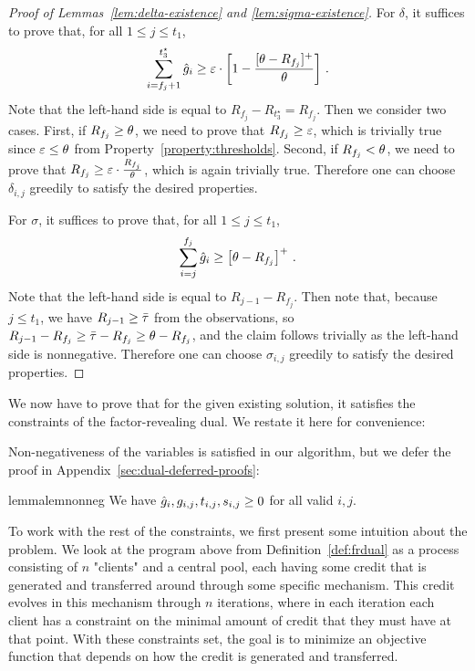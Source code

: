 \begin{proof}[Proof of Lemmas~\ref{lem:delta-existence} and \ref{lem:sigma-existence}]
For $\delta$, it suffices to prove that, for all $1 \leq j \leq t_1$,
\[\sum_{i=f_j+1}^{t_3^\star} \hat{g}_i \geq \varepsilon \cdot \left[1 -\frac{[\theta-R_{f_j}]^+}{\theta}\right]\,.\]
Note that the left-hand side is equal to $R_{f_j} - R_{t_3^\star} = R_{f_j}$.
Then we consider two cases.
First, if $R_{f_j} \geq \theta$, we need to prove that $R_{f_j} \geq \varepsilon$, which is trivially true since $\varepsilon\leq \theta$ from Property~\ref{property:thresholds}.
Second, if $R_{f_j} < \theta$, we need to prove that $R_{f_j} \geq \varepsilon \cdot \frac{R_{f_j}}{\theta}$, which is again trivially true.
Therefore one can choose $\delta_{i,j}$ greedily to satisfy the desired properties.

For $\sigma$, it suffices to prove that, for all $1 \leq j \leq t_1$,
\[\sum_{i=j}^{f_j} \hat{g}_i \geq \left[\theta - R_{f_j}\right]^+\,.\]
Note that the left-hand side is equal to $R_{j - 1} - R_{f_j}$.
Then note that, because $j \leq t_1$, we have $R_{j - 1} \geq \bar\tau$ from the observations, so $R_{j-1} - R_{f_j} \geq \bar\tau - R_{f_j}\geq \theta - R_{f_j}$, and the claim follows trivially as the left-hand side is nonnegative.
Therefore one can choose $\sigma_{i,j}$ greedily to satisfy the desired properties.
\end{proof}

We now have to prove that for the given existing solution, it satisfies the constraints of the factor-revealing dual. We restate it here for convenience:


Non-negativeness of the variables is satisfied in our algorithm, but we defer the proof in Appendix~\ref{sec:dual-deferred-proofs}:
\begin{restatable}{lemma}{lemnonneg}\label{lem:nonneg}
We have $\hat{g}_i, g_{i,j}, t_{i,j}, s_{i,j} \geq 0$ for all valid $i, j$.
\end{restatable}
To work with the rest of the constraints, we first present some intuition about the problem.
We look at the program above from Definition~\ref{def:frdual} as a process consisting of $n$ "clients" and a central pool, each having some credit that is generated and transferred around through some specific mechanism.
This credit evolves in this mechanism through $n$ iterations, where in each iteration each client has a constraint on the minimal amount of credit that they must have at that point.
With these constraints set, the goal is to minimize an objective function that depends on how the credit is generated and transferred.


